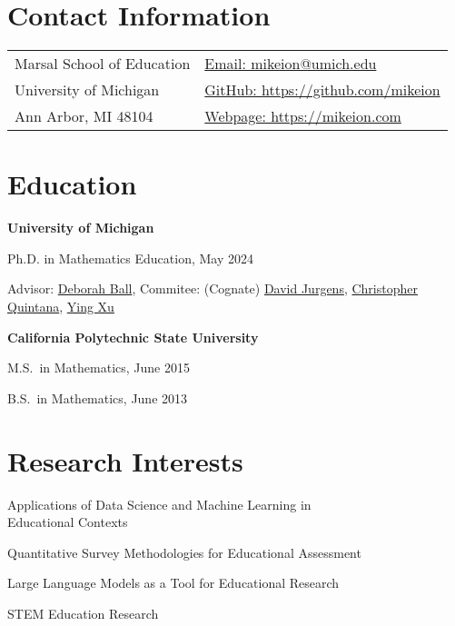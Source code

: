 \documentclass[margin,line]{res}
\newenvironment{list3}{
        \begin{list}{\ding{113}}{%
            \setlength{\itemsep}{0in}
            \setlength{\parsep}{0in} \setlength{\parskip}{0in}
            \setlength{\topsep}{0in} \setlength{\partopsep}{0in}
            \setlength{\leftmargin}{0in}
            \setlength{\rightmargin}{1.25in}}}{\end{list}}
\begin{document}

\begin{resume}

\section{\sc Contact Information}

\begin{tabular}{@{}p{2in}p{4in}}
Marsal School of Education  & \href{mailto:mikeion@umich.edu}{Email: mikeion@umich.edu}  \\
University of Michigan & \href{https://github.com/mikeion}{GitHub: https://github.com/mikeion} \\
Ann Arbor, MI 48104  & \href{https://mikeion.com}{Webpage: https://mikeion.com} \\
\end{tabular}

\section{\sc Education}

{\bf University of Michigan}\\
\vspace*{-.1in}
\begin{list3}
\item[] Ph.D. in Mathematics Education, May 2024
\item[] Advisor: \href{https://deborahloewenbergball.com/}{Deborah Ball}, Commitee: (Cognate) \href{https://jurgens.people.si.umich.edu/}{David Jurgens}, \href{https://marsal.umich.edu/directory/faculty-staff/christopher-quintana}{Christopher Quintana}, \href{https://marsal.umich.edu/directory/faculty-staff/ying-xu}{Ying Xu}
\end{list3}

{\bf California Polytechnic State University}\\
\vspace*{-.1in}
\begin{list3}
\item[] M.S.~in Mathematics, June 2015
\item[] B.S.~in Mathematics, June 2013
\end{list3}

\section{\sc Research Interests}
\begin{list3}
\item Applications of Data Science and Machine Learning in \\
Educational Contexts
\item Quantitative Survey Methodologies for Educational Assessment
\item Large Language Models as a Tool for Educational Research
\item STEM Education Research


\end{list3}
\end{resume}
\end{document}
